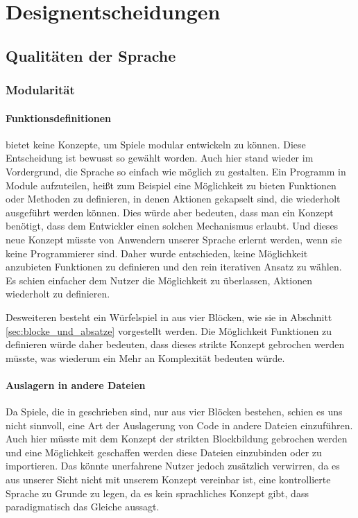 
\chapter{Designentscheidungen}
\label{cha:designentscheidungen}

\section{Qualitäten der Sprache}
\label{sec:qualitaten_der_sprache}

	\subsection{Modularität}
	\label{sub:modularitat}

		\subsubsection{Funktionsdefinitionen}
		\label{subsub:funktionsdefinitionen}
			\dg bietet keine Konzepte, um Spiele modular entwickeln zu können. Diese Entscheidung ist bewusst so gewählt worden. Auch hier stand wieder im Vordergrund, die Sprache so einfach wie möglich zu gestalten. Ein Programm in Module aufzuteilen, heißt zum Beispiel eine Möglichkeit zu bieten Funktionen oder Methoden zu definieren, in denen Aktionen gekapselt sind, die wiederholt ausgeführt werden können. Dies würde aber bedeuten, dass man ein Konzept benötigt, dass dem Entwickler einen solchen Mechanismus erlaubt. Und dieses neue Konzept müsste von Anwendern unserer Sprache erlernt werden, wenn sie keine Programmierer sind. Daher wurde entschieden, keine Möglichkeit anzubieten Funktionen zu definieren und den rein iterativen Ansatz zu wählen. Es schien einfacher dem Nutzer die Möglichkeit zu überlassen, Aktionen wiederholt zu definieren.

			Desweiteren besteht ein Würfelspiel in \dg aus vier Blöcken, wie sie in Abschnitt \ref{sec:blocke_und_absatze} vorgestellt werden. Die Möglichkeit Funktionen zu definieren würde daher bedeuten, dass dieses strikte Konzept gebrochen werden müsste, was wiederum ein Mehr an Komplexität bedeuten würde.

		\subsubsection{Auslagern in andere Dateien}
		\label{subsub:auslagern_in_andere_dateien}
			Da Spiele, die in \dg geschrieben sind, nur aus vier Blöcken bestehen, schien es uns nicht sinnvoll, eine Art der Auslagerung von Code in andere Dateien einzuführen. Auch hier müsste mit dem Konzept der strikten Blockbildung gebrochen werden und eine Möglichkeit geschaffen werden diese Dateien einzubinden oder zu importieren. Das könnte unerfahrene Nutzer jedoch zusätzlich verwirren, da es aus unserer Sicht nicht mit unserem Konzept vereinbar ist, \dg eine kontrollierte Sprache zu Grunde zu legen, da es kein sprachliches Konzept gibt, dass paradigmatisch das Gleiche aussagt.

